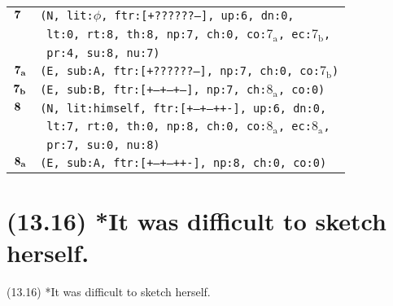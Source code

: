 \documentclass{article}
\begin{document}
\begin{minipage}{\textwidth}
{\begin{tabular}{|r|l|}
    ${\textbf{\textrm{7}}_{\phantom{z}}}$ & \texttt{\texttt{(N,~lit:$\phi$,~ftr:[+??????--],~up:6,~dn:0,}} \\
    & \texttt{\texttt{~lt:0,~rt:8,~th:8,~np:7,~ch:0,~co:${\textrm{7}_{\textrm{a}}}$,~ec:${\textrm{7}_{\textrm{b}}}$,}} \\
    & \texttt{\texttt{~pr:4,~su:8,~nu:7)}} \\
    ${\textbf{\textrm{7}}_{\textbf{\textrm{a}}}}$ & \texttt{\texttt{(E,~sub:A,~ftr:[+??????--],~np:7,~ch:0,~co:${\textrm{7}_{\textrm{b}}}$)}} \\
    ${\textbf{\textrm{7}}_{\textbf{\textrm{b}}}}$ & \texttt{\texttt{(E,~sub:B,~ftr:[+--+--+--],~np:7,~ch:${\textrm{8}_{\textrm{a}}}$,~co:0)}} \\
    ${\textbf{\textrm{8}}_{\phantom{z}}}$ & \texttt{\texttt{(N,~lit:himself,~ftr:[+--+--++-],~up:6,~dn:0,}} \\
    & \texttt{\texttt{~lt:7,~rt:0,~th:0,~np:8,~ch:0,~co:${\textrm{8}_{\textrm{a}}}$,~ec:${\textrm{8}_{\textrm{a}}}$,}} \\
    & \texttt{\texttt{~pr:7,~su:0,~nu:8)}} \\
    ${\textbf{\textrm{8}}_{\textbf{\textrm{a}}}}$ & \texttt{\texttt{(E,~sub:A,~ftr:[+--+--++-],~np:8,~ch:0,~co:0)}} \\
    \hline
  \end{tabular}
  }
\end{minipage}
\bigbreak

\clearpage

%
%

\section*{(13.16) *It was difficult to sketch herself.}

\bigbreak
\begin{enumerate*}
\item[(13.16)] *It was difficult to sketch herself.
\end{enumerate*}
\bigbreak
\end{document}
